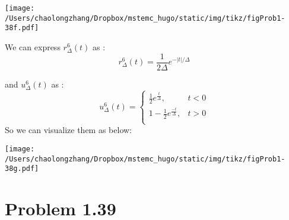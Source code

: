 \documentclass[koma,a4paper,utopia,12pt,listings-color,microtype,paralist,colorlinks,urlcolor=red]{org-article}
\begin{document}
\begin{center}
\texttt{[image: /Users/chaolongzhang/Dropbox/mstemc\_hugo/static/img/tikz/figProb1-38f.pdf]}
\end{center}

We can express \(r_{\Delta}^{6}(t)\) as :
\begin{equation*}
r_{\Delta}^{6}(t) = \frac{1}{2\Delta} e^{-|t|/\Delta}
\end{equation*}

and \(u_{\Delta}^{6}(t)\) as :
\begin{equation*}
u_{\Delta}^{6}(t) =
\begin{cases}
\frac{1}{2} e^{\frac{t}{\Delta}} , & t< 0 \\
1 - \frac{1}{2}e^{ \frac{-t}{\Delta}} , & t> 0 \\
\end{cases}
\end{equation*}
So we can visualize them as below:
\begin{center}
\texttt{[image: /Users/chaolongzhang/Dropbox/mstemc\_hugo/static/img/tikz/figProb1-38g.pdf]}
\end{center}
\section{Problem 1.39}
\label{sec:orgfa85644}
\end{document}
